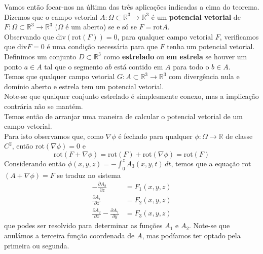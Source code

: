 \documentclass{article}
\newcommand{\R}{\mathbb{R}}
\begin{document}
Vamos então focar-nos na última das três aplicações indicadas a cima do teorema. Dizemos que o campo vetorial $A: \Omega \subset \R^3 \to \R^3$ é um \textbf{potencial vetorial} de $F: \Omega \subset \R^3 \to \R^3$ ($\Omega$ é um aberto) se e só se $F = \text{rot} A$.\\
Observando que $\text{div}(\text{rot}(F)) = 0$, para qualquer campo vetorial $F$, verificamos que $\text{div}F = 0$ é uma condição necessária para que $F$ tenha um potencial vetorial.\\
Definimos um conjunto $D \subset \R^3$ como \textbf{estrelado} ou \textbf{em estrela} se houver um ponto $a \in A$ tal que o segmento $ab$ está contido em $A$ para todo o $b \in A$.\\
Temos que qualquer campo vetorial $G: A \subset \R^3 \to \R^3$ com divergência nula e domínio aberto e estrela tem um potencial vetorial.\\
Note-se que qualquer conjunto estrelado é simplesmente conexo, mas a implicação contrária não se mantém.\\
Temos então de arranjar uma maneira de calcular o potencial vetorial de um campo vetorial.\\
Para isto observamos que, como $\nabla \phi$ é fechado para qualquer $\phi: \Omega \to \R$ de classe $C^2$, então rot$(\nabla \phi) = 0$ e 
$$ \text{rot}(F+\nabla \phi) = \text{rot}(F) + \text{rot}(\nabla \phi) = \text{rot}(F) $$
Considerando então $\phi(x,y,z) = -\int_0^z A_3(x,y,t) \, dt$, temos que a equação rot$(A+\nabla \phi) = F$ se traduz no sistema
\begin{align*}
-\frac{\partial A_2}{\partial z} &= F_1(x,y,z) \\
\frac{\partial A_1}{\partial z} &= F_2(x,y,z) \\
\frac{\partial A_2}{\partial x} - \frac{\partial A_1}{\partial y} &= F_3(x,y,z)
\end{align*}
que podes ser resolvido para determinar as funções $A_1$ e $A_2$. Note-se que anulámos a terceira função coordenada de $A$, mas podíamos ter optado pela primeira ou segunda.
\end{document}
